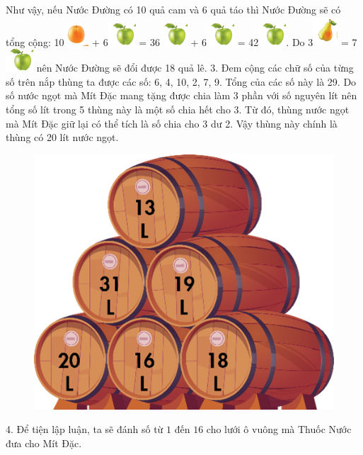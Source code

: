 \vskip 0.1cm
Như vậy, nếu Nước Đường có 10 quả cam và 6 quả táo thì Nước Đường sẽ có tổng cộng:
\vskip 0.1cm
10\includegraphics{6}  + 6\includegraphics{5}  = 36\includegraphics{5}  + 6\includegraphics{5}  = 42\includegraphics{5}.
\vskip 0.1cm
Do 3\includegraphics{4}  = 7\includegraphics{5}  nên Nước Đường sẽ đổi được 18 quả lê.
\vskip 0.1cm
3.
\vskip 0.1cm
Đem cộng các chữ số của từng số trên nắp thùng ta được các số: 6, 4, 10, 2, 7, 9. Tổng của các số này là 29. Do số nước ngọt mà Mít Đặc mang tặng được chia làm 3 phần với số nguyên lít nên tổng số lít trong 5 thùng này là một số chia hết cho 3. Từ đó, thùng nước ngọt mà Mít Đặc giữ lại có thể tích là số chia cho 3 dư 2. Vậy thùng này chính là thùng có 20 lít nước ngọt.
\begin{figure}[H]
	\centering
	\vspace*{-5pt}
	\captionsetup{labelformat= empty, justification=centering}
	\includegraphics[width=0.3\linewidth]{7}
	\vspace*{-15pt}
\end{figure}
4. Để tiện lập luận, ta sẽ đánh số từ $1$ đến $16$ cho lưới ô vuông mà Thuốc Nước đưa cho Mít Đặc.
